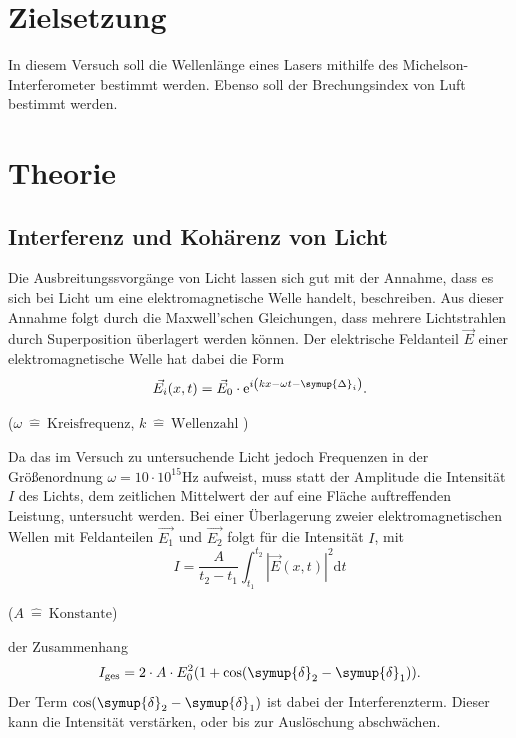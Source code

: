 \section{Zielsetzung}
\label{sec:Zielsetzung}

In diesem Versuch soll die Wellenlänge eines Lasers mithilfe des Michelson-Interferometer bestimmt werden.
Ebenso soll der Brechungsindex von Luft bestimmt werden.


\section{Theorie}
\subsection{Interferenz und Kohärenz von Licht}
Die Ausbreitungssvorgänge von Licht lassen sich gut mit der Annahme, dass es sich bei Licht um eine elektromagnetische Welle handelt, beschreiben.
Aus dieser Annahme folgt durch die Maxwell'schen Gleichungen, dass mehrere Lichtstrahlen durch Superposition überlagert werden können.
Der elektrische Feldanteil $\vec{E}$ einer elektromagnetische Welle hat dabei die Form
\begin{equation}
  \vec{E_i}(x,t)=\vec{E}_0\cdot \mathrm{e}^{i\left(kx -\omega t -\symup{\Delta}_i\right)} \label{eq:Welle} \text{.}
\end{equation}
\begin{center}
 \small {($ \omega \: \hat{=} \:\text{Kreisfrequenz}$, $ k \: \hat{=} \:\text{Wellenzahl}$ )}
\end{center}
Da das im Versuch zu untersuchende Licht jedoch Frequenzen in der Größenordnung $\omega = 10 \cdot 10^{15} \si{\hertz}$ aufweist, muss statt der Amplitude die Intensität $I$ des Lichts,
dem zeitlichen Mittelwert der auf eine Fläche auftreffenden Leistung, untersucht werden.
Bei einer Überlagerung zweier elektromagnetischen Wellen mit Feldanteilen $\vec{E_1}$ und $\vec{E_2}$ folgt für die Intensität $I$, mit
\begin{equation}
  I=\frac{A}{t_2-t_1}\int_{t_1}^{t_2}|\vec{E}(x,t)|^2\mathrm{d}t
\end{equation}
\begin{center}
 \small {($ A \: \hat{=} \:\text{Konstante}$)}
\end{center}
der Zusammenhang
\begin{equation}
I_\text{ges}=2\cdot A \cdot E^2_0(1+\cos(\symup{\delta}_2-\symup{\delta}_1)) \text{.}
\end{equation}
Der Term $\cos(\symup{\delta}_2-\symup{\delta}_1)$ ist dabei der Interferenzterm. Dieser kann die Intensität verstärken, oder bis zur Auslöschung abschwächen.
